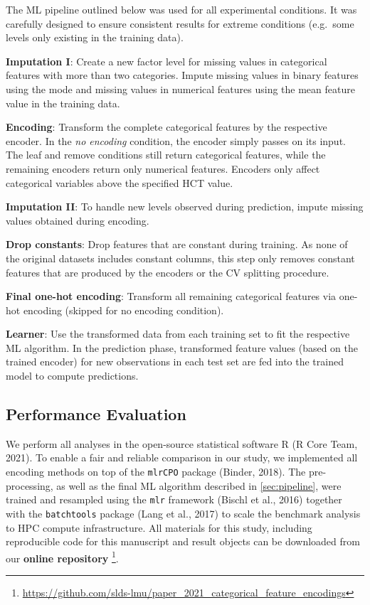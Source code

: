 \documentclass[smallextended]{svjour3}       %
\begin{document}
The ML pipeline outlined below was used for all experimental conditions.
It was carefully designed to ensure consistent results for extreme conditions (e.g.~some levels only existing in the training data).

\textbf{Imputation I}: Create a new factor level for missing values in categorical features with more than two categories. Impute missing values in binary features using the mode and missing values in numerical features using the mean feature value in the training data.

\textbf{Encoding}: Transform the complete categorical features by the respective encoder.
In the \textit{no encoding} condition, the encoder simply passes on its input.
The leaf and remove conditions still return categorical features, while the remaining encoders return only numerical features. Encoders only affect categorical variables above the specified HCT value.

\textbf{Imputation II}: To handle new levels observed during prediction, impute missing values obtained during encoding.

\textbf{Drop constants}: Drop features that are constant during training. As none of the original datasets includes constant columns, this step only removes constant features that are produced by the encoders or the CV splitting procedure.

\textbf{Final one-hot encoding}: Transform all remaining
categorical features via one-hot encoding (skipped for no encoding condition).

\textbf{Learner}: Use the transformed data from each training set to fit the respective ML algorithm.
In the prediction phase, transformed feature values (based on the trained encoder) for new observations in each test set are fed into the trained model to compute predictions.

\hypertarget{performance-evaluation}{%
\subsection{Performance Evaluation}\label{performance-evaluation}}

We perform all analyses in the open-source statistical software R (R Core Team, 2021).
To enable a fair and reliable comparison in our study, we implemented all encoding methods on top of the \texttt{mlrCPO} package (Binder, 2018).
The pre-processing, as well as the final ML algorithm described in \ref{sec:pipeline}, were trained and resampled using the \texttt{mlr} framework (Bischl et al., 2016) together with the \texttt{batchtools} package (Lang et al., 2017) to scale the benchmark analysis to HPC compute infrastructure.
All materials for this study, including reproducible code for this manuscript and result objects can be downloaded from our \textbf{online repository} \footnote{\url{https://github.com/slds-lmu/paper_2021_categorical_feature_encodings}}.
\end{document}
